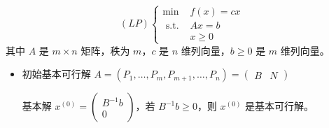 \begin{remark}
    \[(L P)\left\{\begin{array}{lc}
        \min & f(x)=c x \\
        \text { s.t. } & A x=b \\
        & x \geq 0
    \end{array}\right.\]
    其中 $A$ 是 $m \times n$ 矩阵，秩为 $m$，$c$ 是 $n$ 维列向量，$b\ge 0$ 是 $m$ 维列向量。
    \begin{itemize}
        \item 初始基本可行解
            $A = (P_1, \dots, P_m, P_{m + 1}, \dots, P_n) = \begin{pmatrix}
                B & N
            \end{pmatrix}$

            基本解 $x^{(0)} = \begin{pmatrix}
                B^{-1}b \\
                0
            \end{pmatrix}$，若 $B^{-1}b \ge 0$，则 $x^{(0)}$ 是基本可行解。


\end{itemize}
\end{remark}
